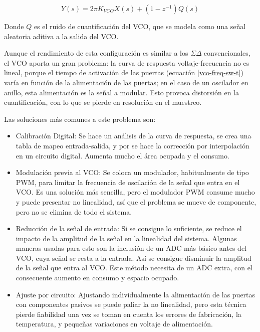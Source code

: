 \documentclass[12pt]{report} %
\newcommand{\sigmadelta}{$\Sigma\Delta\; $}
\begin{document}
	\begin{figure}[h]
		\begin{equation}
			\label{vco-open-loop-laplace}
			Y(s)=2\pi K_{VCO}X(s) + (1 - z^{-1})Q(s)
		\end{equation}
	\end{figure}
	
	Donde $Q$ es el ruido de cuantificación del VCO, que se modela como una señal aleatoria aditiva a la salida del VCO.
	
	Aunque el rendimiento de esta configuración es similar a los \sigmadelta convencionales, el VCO aporta un gran problema: la curva de respuesta voltaje-frecuencia no es lineal, porque el tiempo de activación de las puertas (ecuación \ref{vco-freq-sw-t}) varía en función de la alimentación de las puertas; en el caso de un oscilador en anillo, esta alimentación es la señal a modular. Esto provoca distorsión en la cuantificación, con lo que se pierde en resolución en el muestreo.
	
	Las soluciones más comunes a este problema son:
	
	\begin{itemize}
		\item Calibración Digital: Se hace un análisis de la curva de respuesta, se crea una tabla de mapeo entrada-salida, y por se hace la corrección por interpolación en un circuito digital. Aumenta mucho el área ocupada y el consumo.
		
		\item Modulación previa al VCO: Se coloca un modulador, habitualmente de tipo PWM, para limitar la frecuencia de oscilación de la señal que entra en el VCO. Es una solución más sencilla, pero el modulador PWM consume mucho y puede presentar no linealidad, así que el problema se mueve de componente, pero no se elimina de todo el sistema.
		
		\item Reducción de la señal de entrada: Si se consigue lo suficiente, se reduce el impacto de la amplitud de la señal en la linealidad del sistema. Algunas maneras usadas para esto son la inclusión de un ADC más básico antes del VCO, cuya señal se resta a la entrada. Así se consigue disminuir la amplitud de la señal que entra al VCO. Este método necesita de un ADC extra, con el consecuente aumento en consumo y espacio ocupado.
		
		\item Ajuste por circuito: Ajustando individualmente la alimentación de las puertas con componentes pasivos se puede paliar la no linealidad, pero esta técnica pierde fiabilidad una vez se toman en cuenta los errores de fabricación, la temperatura, y pequeñas variaciones en voltaje de alimentación.
	\end{itemize}
	
\end{document}
